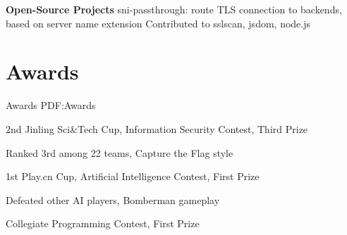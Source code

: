 \documentclass[a4paper,MMMyyyy,nonstop]{simpleresumecv}
\begin{document}
\begin{body}



\GapNoBreak

\textbf{Open-Source Projects}
\BulletItem
sni-passthrough: route TLS connection to backends, based on server name extension
\BulletItem
Contributed to sslscan, jsdom, node.js


\section
{Awards}
{Awards}
{PDF:Awards}

\BulletItem
2nd Jinling Sci\&Tech Cup, Information Security Contest, Third Prize
\hfill
\textbf{  }
\begin{detail}
\SubItem
Ranked 3rd among 22 teams, Capture the Flag style
\end{detail}

\BulletItem
1st Play.cn Cup, Artificial Intelligence Contest, First Prize
\hfill
\textbf{  }
\begin{detail}
\SubItem
Defeated other AI players, Bomberman gameplay
\end{detail}

\BulletItem
Collegiate Programming Contest, First Prize
\hfill
\textbf{  }


\end{body}
\end{document}
